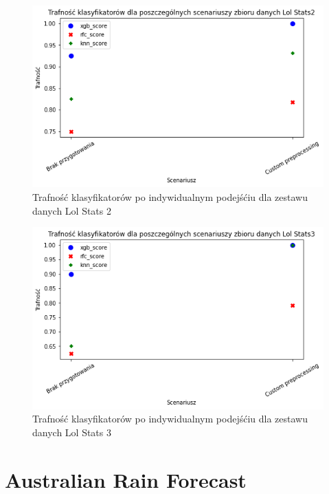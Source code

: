 \documentclass{book}
\begin{document}
\begin{figure}[H]
\centerline{\includegraphics[scale=0.5]{Lol_Stats_2_Custom}}
\centering
\caption{Trafność klasyfikatorów po indywidualnym podejśćiu dla zestawu danych Lol Stats 2}
\end{figure}

\begin{figure}[H]
\centerline{\includegraphics[scale=0.5]{Lol_Stats_3_Custom}}
\centering
\caption{Trafność klasyfikatorów po indywidualnym podejśćiu dla zestawu danych Lol Stats 3}
\end{figure}



\section{Australian Rain Forecast}
\end{document}
